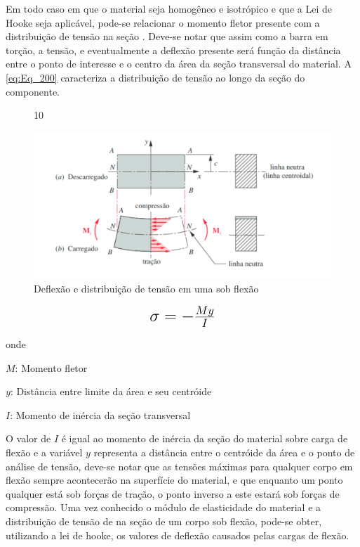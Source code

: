 Em todo caso em que o material seja homogêneo e isotrópico e que a Lei de Hooke seja aplicável, pode-se relacionar o momento fletor presente com a distribuição de
tensão na seção \autocite{Hibbeler2010}. Deve-se notar que assim como a barra em torção, a tensão, e eventualmente a deflexão presente será função da distância entre o
ponto de interesse e o centro da área da seção transversal do material. A \autoref{eq:Eq_200} caracteriza a distribuição de tensão ao longo da seção do componente.

\begin{figure}[htb]
	\caption{\label{fig:1070} Deflexão e distribuição de tensão em uma sob flexão}10
	\begin{center}
		\includegraphics[width=\textwidth]{pictures/1070.png}
	\end{center}
\end{figure}

\begin{equation}\label{eq:Eq_200}%
\mbox{\fontsize{17.28}{21.6}\selectfont\( %
\sigma = - \frac{My}{I}
\)} %
\end{equation}

onde

$M$: Momento fletor

$y$: Distância entre limite da área e seu centróide

$I$: Momento de inércia da seção transversal

\hfill

O valor de $I$ é igual ao momento de inércia da seção do material sobre carga de flexão e a variável $y$ representa a distância entre o centróide da área e o ponto de
análise de tensão, deve-se notar que as tensões máximas para qualquer corpo em flexão sempre acontecerão na superfície do material, e que enquanto um ponto qualquer
está sob forças de tração, o ponto inverso a este estará sob forças de compressão. Uma vez conhecido o módulo de elasticidade do material e a distribuição de tensão
de na seção de um corpo sob flexão, pode-se obter, utilizando a lei de hooke, os valores de deflexão causados pelas cargas de flexão.

